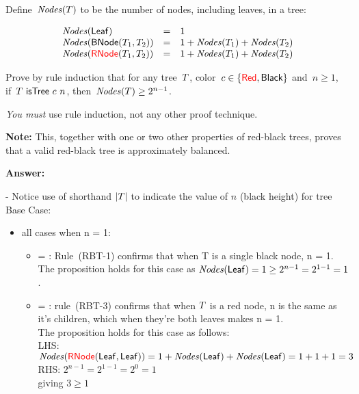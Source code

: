 \documentclass{article}
\begin{document}
Define~$\mathit{Nodes}(T)$ to be the number of nodes, including leaves, in a
tree:

\[
\begin{array}{l l l}
  \mathit{Nodes}(\mathsf{Leaf}) & = & 1\\
  \mathit{Nodes}(\mathsf{BNode}(T_1, T_2)) & = & 1 + \mathit{Nodes}(T_1) + \mathit{Nodes}(T_2)\\
  \mathit{Nodes}({\color{red}{\mathsf{RNode}}}(T_1, T_2)) & = & 1 + \mathit{Nodes}(T_1) + \mathit{Nodes}(T_2)
\end{array}
\]

\begin{task}
  Prove by rule induction that for any tree~$T$,
  color~$c \in \{{\color{red}{\mathsf{Red}}}, \mathsf{Black}\}$ and~$n \geq 1$,
  if~$T ~\mathsf{isTree}~c~n$, then~$\mathit{Nodes}(T) \geq 2^{n-1}$.

  {\em You must} use rule induction, not any other proof technique.

  \textbf{Note:} This, together with one or two other properties of
  red-black trees, proves that a valid red-black tree is approximately
  balanced.
\end{task}

\textbf{Answer:}

- Notice use of shorthand $|T|$ to indicate the value of $n$ (black height) for tree \tree \\

Base Case: 
\begin{itemize}
    \item all cases when n = 1:
        \begin{itemize}
            \item {\tree = \leaf}: Rule~(RBT-1) confirms that when T is a single black node, n = 1.\\
            The proposition holds for this case as $\mathit{Nodes}(\mathsf{Leaf}) = 1 \geq 2^{n-1} = 2^{1-1} = 1$.

            \item {\tree = \rnode{\leaf}{\leaf}}: rule~(RBT-3) confirms that when $T$ is a red node,
            n is the same as it's children, which when they're both leaves makes n = 1.\\
            The proposition holds for this case as follows:\\
            LHS: $\mathit{Nodes}({\color{red}{\mathsf{RNode}}}(\mathsf{Leaf}, \mathsf{Leaf})) = 1 + \mathit{Nodes}(\mathsf{Leaf}) + \mathit{Nodes}(\mathsf{Leaf}) = 1 + 1 + 1 = 3$\\
            RHS: $2^{n-1} = 2 ^ {1 - 1} = 2^0 = 1$\\
            giving $3 \geq 1$ 
        \end{itemize}
\end{itemize}
\end{document}
